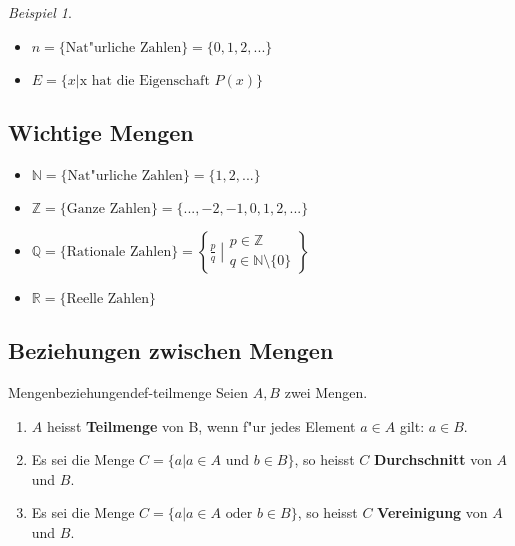 \documentclass[11pt]{article}
\theoremstyle{remark}
\newtheorem{exa}{Beispiel}[section]
\theoremstyle{definition}
\theoremstyle{remark}
\begin{document}
\begin{exa}\
\begin{itemize}
\item \(n=\{\text{Nat"urliche Zahlen}\} = \{0,1,2,...\}\)
\item \(E=\{x|\text{x hat die Eigenschaft } P(x)\}\)
\end{itemize}
\end{exa}

\subsection{Wichtige Mengen}
\label{sec:orga565e26}
\begin{itemize}
\item \(\mathbb{N}=\{\text{Nat"urliche Zahlen}\} = \{1,2,...\}\)
\item \(\mathbb{Z}=\{\text{Ganze Zahlen}\} = \{...,-2,-1,0,1,2,...\}\)
\item \(\mathbb{Q}=\{\text{Rationale
   Zahlen}\}=\left\{\left.\displaystyle\frac{p}{q}\;\right\vert\begin{array}{c}p \in \mathbb{Z} \\ q \in \mathbb{N} \setminus \{0\}\end{array}\right\}\)
\item \(\mathbb{R}=\{\text{Reelle Zahlen}\}\)
\end{itemize}

\subsection{Beziehungen zwischen Mengen}
\label{sec:orgcffbbc3}
\begin{definition}{Mengenbeziehungen}{def-teilmenge}
Seien \(A,B\) zwei Mengen. 
\begin{enumerate}
\item \(A\) heisst \textbf{Teilmenge} von B, wenn f"ur jedes Element \(a\in A\) gilt: \(a\in B\).
\item Es sei die Menge \(C = \{a|a\in A \text{ und } b\in B\}\), so heisst \(C\) \textbf{Durchschnitt} von \(A\) und \(B\).
\item Es sei die Menge \(C = \{a|a\in A \text{ oder } b\in B\}\), so heisst \(C\) \textbf{Vereinigung} von \(A\) und \(B\).
\end{enumerate}
\end{definition}
\end{document}
